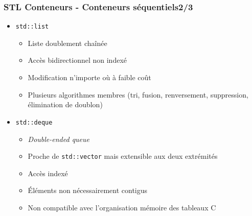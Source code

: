 \documentclass[C++.tex]{subfiles}
\begin{document}
\begin{frame}
	\frametitle{STL Conteneurs - Conteneurs séquentiels\titlehfill{}2/3}
	\begin{itemize}
		\item \lstinline|std::list|
		\begin{itemize}
			\item Liste doublement chaînée
			\item Accès bidirectionnel non indexé
			\item Modification n'importe où à faible coût
			\item Plusieurs algorithmes membres (tri, fusion, renversement, suppression, élimination de doublon)

		\end{itemize}

		\item \lstinline|std::deque|
		\begin{itemize}
			\item \textit{Double-ended queue}
			\item Proche de \lstinline|std::vector| mais extensible aux deux extrémités
			\item Accès indexé
			\item Éléments non nécessairement contigus
			\item Non compatible avec l'organisation mémoire des tableaux C
		\end{itemize}
	\end{itemize}
\end{frame}
\end{document}
